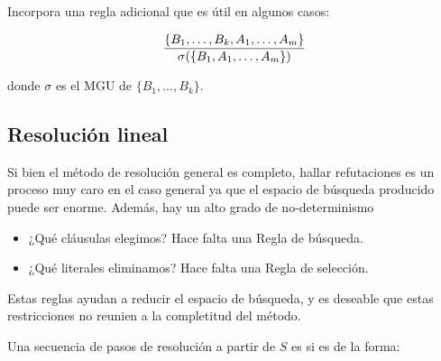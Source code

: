 Incorpora una regla adicional que es útil en algunos casos: 

\[\frac{\{B_1,\dots,B_k,A_1,\dots,A_m\}}{\sigma(\{B_1,A_1,\dots,A_m\})}\]

donde $\sigma$ es el MGU de $\{B_1,\dots,B_k\}$.

\subsection{Resolución lineal}

Si bien el método de resolución general es completo, hallar refutaciones es un proceso muy caro en el caso general ya que el espacio de búsqueda producido puede ser enorme. Además, hay un alto grado de no-determinismo
\begin{itemize}
  \item ¿Qué cláusulas elegimos? Hace falta una Regla de búsqueda.
  \item ¿Qué literales eliminamos? Hace falta una Regla de selección.
\end{itemize}

Estas reglas ayudan a reducir el espacio de búsqueda, y es deseable que estas restricciones no reunien a la completitud del método.

Una secuencia de pasos de resolución a partir de $S$ es  si es de la forma:

\begin{center}
\end{center}

